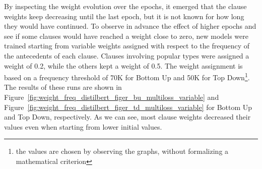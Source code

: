 By inspecting the weight evolution over the epochs, it emerged that the clause weights keep decreasing until the last epoch, but it is not known for how long they would have continued. To observe in advance the effect of higher epochs and see if some clauses would have reached a weight close to zero, new models were trained starting from variable weights assigned with respect to the frequency of the antecedents of each clause. Clauses involving popular types were assigned a weight of 0.2, while the others kept a weight of 0.5. The weight assignment is based on a frequency threshold of 70K for Bottom Up and 50K for Top Down\footnote{the values are chosen by observing the graphs, without formalizing a mathematical criterion}. The results of these runs are shown in Figure~\ref{fig:weight_freq_distilbert_figer_bu_multiloss_variable} and Figure~\ref{fig:weight_freq_distilbert_figer_td_multiloss_variable} for Bottom Up and Top Down, respectively. As we can see, most clause weights decreased their values even when starting from lower initial values.

